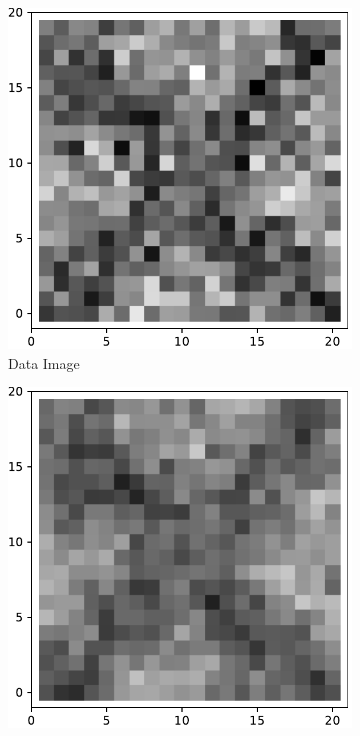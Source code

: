    \begin{figure}[!h]
        \centering
        \begin{subfigure}[b]{0.24\textwidth}
            \centering
            \includegraphics[width=\textwidth]{./img/ximage.pdf}
            \caption[]%
            {{\small Data Image}}    
            \label{fig:ximage7}
        \end{subfigure}
        \begin{subfigure}[b]{0.24\textwidth}  
            \centering 
            \includegraphics[width=\textwidth]{./img/5755d1-0.pdf}

\end{subfigure}
\end{figure}
